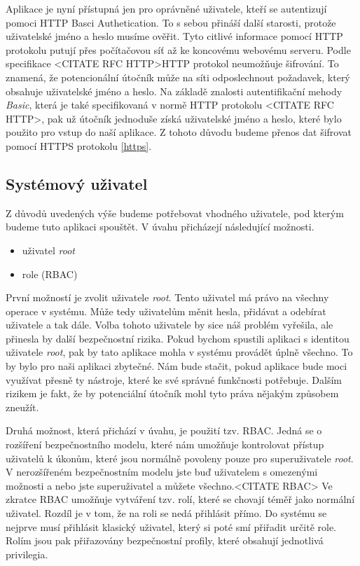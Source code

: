 Aplikace je nyní přístupná jen pro oprávněné uživatele, kteří se autentizují pomoci HTTP Basci Authetication. To s sebou přináší další starosti, protože uživatelské jméno a heslo musíme ověřit. Tyto citlivé informace pomocí HTTP protokolu putují přes počítačovou síť až ke koncovému webovému serveru. Podle specifikace <CITATE RFC HTTP>HTTP protokol neumožňuje šifrování. To znamená, že potencionální útočník může na síti odposlechnout požadavek, který obsahuje uživatelské jméno a heslo. Na základě znalosti autentifikační mehody \emph{Basic}, která je také specifikovaná v normě HTTP protokolu <CITATE RFC HTTP>, pak už útočník jednoduše získá uživatelské jméno a heslo, které bylo použito pro vstup do naší aplikace. Z tohoto důvodu budeme přenos dat šifrovat pomocí HTTPS protokolu \ref{https}.
    \subsection{Systémový uživatel}
    \label{sysuser}
    Z důvodů uvedených výše budeme potřebovat vhodného uživatele, pod kterým budeme tuto aplikaci spouštět. V úvahu přicházejí následující možnosti.
    \begin{itemize}
      \item uživatel \emph{root}
      \item role (RBAC)
    \end{itemize}

    První možností je zvolit uživatele \emph{root}. Tento uživatel má právo na všechny operace v systému. Může tedy uživatelům měnit hesla, přidávat a odebírat uživatele a tak dále. Volba tohoto uživatele by sice náš problém vyřešila, ale přinesla by další bezpečnostní rizika. Pokud bychom spustili aplikaci s identitou uživatele \emph{root}, pak by tato aplikace mohla v systému provádět úplně všechno. To by bylo pro naši aplikaci zbytečné. Nám bude stačit, pokud aplikace bude moci využívat přesně ty nástroje, které ke své správné funkčnosti potřebuje. Dalším rizikem je fakt, že by potenciální útočník mohl tyto práva nějakým způsobem zneužít.

    Druhá možnost, která přichází v úvahu, je použití tzv. RBAC. Jedná se o rozšíření bezpečnostního modelu, které nám umožňuje kontrolovat přístup uživatelů k úkonům, které jsou normálně povoleny pouze pro superuživatele \emph{root}. V nerozšířeném bezpečnostním modelu jste buď uživatelem s omezenými možnosti a nebo jste superuživatel a můžete všechno.<CITATE RBAC> Ve zkratce RBAC umožňuje vytváření tzv. rolí, které se chovají téměř jako normální uživatel. Rozdíl je v tom, že na roli se nedá přihlásit přímo. Do systému se nejprve musí přihlásit klasický uživatel, který si poté smí přiřadit určitě role. Rolím jsou pak přiřazovány bezpečnostní profily, které obsahují jednotlivá privilegia.

